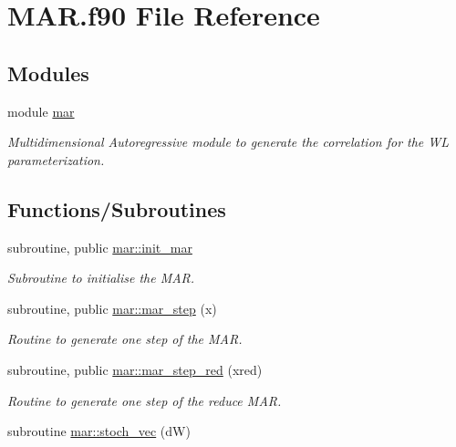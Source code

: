 \hypertarget{MAR_8f90}{}\section{M\+A\+R.\+f90 File Reference}
\label{MAR_8f90}
\subsection*{Modules}
\begin{DoxyCompactItemize}
\item 
module \hyperlink{namespacemar}{mar}
\begin{DoxyCompactList}\small\item\em Multidimensional Autoregressive module to generate the correlation for the WL parameterization. \end{DoxyCompactList}\end{DoxyCompactItemize}
\subsection*{Functions/\+Subroutines}
\begin{DoxyCompactItemize}
\item 
subroutine, public \hyperlink{namespacemar_a1cf5740699e284f3284e25421a56fe71}{mar\+::init\+\_\+mar}
\begin{DoxyCompactList}\small\item\em Subroutine to initialise the M\+AR. \end{DoxyCompactList}\item 
subroutine, public \hyperlink{namespacemar_a1b839ac2dc12dde9fb271ec07c946cec}{mar\+::mar\+\_\+step} (x)
\begin{DoxyCompactList}\small\item\em Routine to generate one step of the M\+AR. \end{DoxyCompactList}\item 
subroutine, public \hyperlink{namespacemar_a8b8f9249138336ac43c7b72c32f4933b}{mar\+::mar\+\_\+step\+\_\+red} (xred)
\begin{DoxyCompactList}\small\item\em Routine to generate one step of the reduce M\+AR. \end{DoxyCompactList}\item 
subroutine \hyperlink{namespacemar_a3697eade9c0f250fbea1375687644267}{mar\+::stoch\+\_\+vec} (dW)
\end{DoxyCompactItemize}
